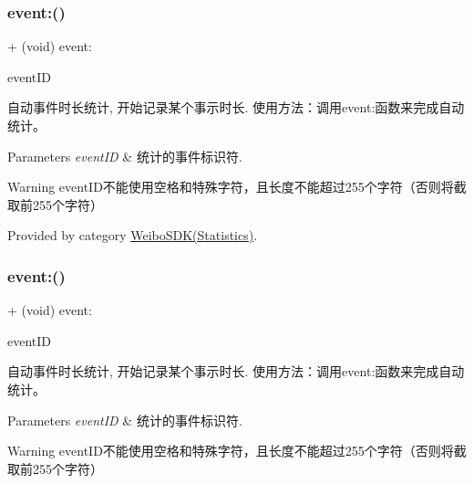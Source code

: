 \mbox{\label{interface_weibo_s_d_k_af035b5557e6dd544e282689323d8c4aa}} 
\subsubsection{\texorpdfstring{event\+:()}{event:()}\hspace{0.1cm}{\footnotesize\ttfamily [1/3]}}
{\footnotesize\ttfamily + (void) event\+: \begin{DoxyParamCaption}\item[{(N\+S\+String $\ast$)}]{event\+ID }\end{DoxyParamCaption}}

自动事件时长统计, 开始记录某个事示时长. 使用方法：调用event\+:函数来完成自动统计。 
\begin{DoxyParams}{Parameters}
{\em event\+ID} & 统计的事件标识符. \\
\hline
\end{DoxyParams}
\begin{DoxyWarning}{Warning}
event\+I\+D不能使用空格和特殊字符，且长度不能超过255个字符（否则将截取前255个字符） 
\end{DoxyWarning}


Provided by category \mbox{\hyperlink{category_weibo_s_d_k_07_statistics_08_af035b5557e6dd544e282689323d8c4aa}{Weibo\+S\+D\+K(\+Statistics)}}.

\mbox{\label{interface_weibo_s_d_k_af035b5557e6dd544e282689323d8c4aa}} 
\subsubsection{\texorpdfstring{event\+:()}{event:()}\hspace{0.1cm}{\footnotesize\ttfamily [2/3]}}
{\footnotesize\ttfamily + (void) event\+: \begin{DoxyParamCaption}\item[{(N\+S\+String $\ast$)}]{event\+ID }\end{DoxyParamCaption}}

自动事件时长统计, 开始记录某个事示时长. 使用方法：调用event\+:函数来完成自动统计。 
\begin{DoxyParams}{Parameters}
{\em event\+ID} & 统计的事件标识符. \\
\hline
\end{DoxyParams}
\begin{DoxyWarning}{Warning}
event\+I\+D不能使用空格和特殊字符，且长度不能超过255个字符（否则将截取前255个字符） 
\end{DoxyWarning}


